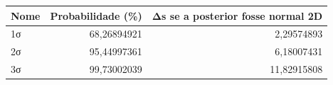 \begin{tabular}{lrr}
\toprule
Nome & Probabilidade (\%) & Δs se a posterior fosse normal 2D \\
\midrule
1σ & 68,26894921 & 2,29574893 \\
2σ & 95,44997361 & 6,18007431 \\
3σ & 99,73002039 & 11,82915808 \\
\bottomrule
\end{tabular}
